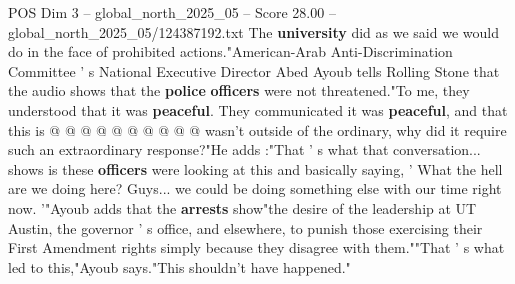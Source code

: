 \begin{textsample}{POS Dim 3 – global\_north\_2025\_05 – Score 28.00 – global\_north\_2025\_05/124387192.txt}
The \textbf{university} did as we said we would do in the face of prohibited actions."American-Arab Anti-Discrimination Committee ' s National Executive Director Abed Ayoub tells Rolling Stone that the audio shows that the \textbf{police} \textbf{officers} were not threatened."To me, they understood that it was \textbf{peaceful}.
They communicated it was \textbf{peaceful}, and that this is @ @ @ @ @ @ @ @ @ @ wasn't outside of the ordinary, why did it require such an extraordinary response?"He adds :"That ' s what that conversation... shows is these \textbf{officers} were looking at this and basically saying, ' What the hell are we doing here?
Guys... we could be doing something else with our time right now. '"Ayoub adds that the \textbf{arrests} show"the desire of the leadership at UT Austin, the governor ' s office, and elsewhere, to punish those exercising their First Amendment rights simply because they disagree with them.""That ' s what led to this,"Ayoub says."This shouldn't have happened."

\end{textsample}

